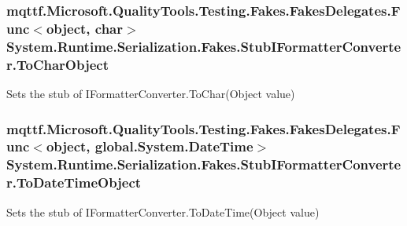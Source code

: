 \hypertarget{class_system_1_1_runtime_1_1_serialization_1_1_fakes_1_1_stub_i_formatter_converter_a322b4c0e77f2befa03833d5a405733b2}{
\subsubsection[{To\-Char\-Object}]{\setlength{\rightskip}{0pt plus 5cm}mqttf.\-Microsoft.\-Quality\-Tools.\-Testing.\-Fakes.\-Fakes\-Delegates.\-Func$<$object, char$>$ System.\-Runtime.\-Serialization.\-Fakes.\-Stub\-I\-Formatter\-Converter.\-To\-Char\-Object}}\label{class_system_1_1_runtime_1_1_serialization_1_1_fakes_1_1_stub_i_formatter_converter_a322b4c0e77f2befa03833d5a405733b2}


Sets the stub of I\-Formatter\-Converter.\-To\-Char(\-Object value)

\hypertarget{class_system_1_1_runtime_1_1_serialization_1_1_fakes_1_1_stub_i_formatter_converter_a2ae1547c6e3b3db576843ecdf51a16b8}{
\subsubsection[{To\-Date\-Time\-Object}]{\setlength{\rightskip}{0pt plus 5cm}mqttf.\-Microsoft.\-Quality\-Tools.\-Testing.\-Fakes.\-Fakes\-Delegates.\-Func$<$object, global.\-System.\-Date\-Time$>$ System.\-Runtime.\-Serialization.\-Fakes.\-Stub\-I\-Formatter\-Converter.\-To\-Date\-Time\-Object}}\label{class_system_1_1_runtime_1_1_serialization_1_1_fakes_1_1_stub_i_formatter_converter_a2ae1547c6e3b3db576843ecdf51a16b8}


Sets the stub of I\-Formatter\-Converter.\-To\-Date\-Time(\-Object value)

